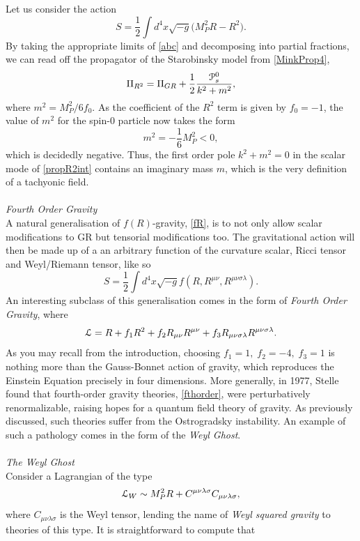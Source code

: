 Let us consider the action
\[
\label{R-R2}
S=\frac{1}{2}\int d^4 x \sqrt{-g} \bigl(M_P^2R-R^2\bigr)
.\]
By taking the appropriate limits of \eqref{abc} and decomposing into partial fractions, we can read off the propagator of the Starobinsky model from \eqref{MinkProp4},
\[
\label{propR2int}
\Pi_{R^2}=\Pi_{GR}+\frac{1}{2}\frac{{\cal P}_s^0}{k^2+m^2}
,\]  
where $m^2=M_P^2/6f_0$. As the coefficient of the $R^2$ term is given by $f_0=-1$, 
the value of $m^2$ for the spin-0 particle now takes the form 
\[
m^2=-\frac{1}{6}M_P^2<0
,\]
which is decidedly negative. Thus, the first order pole $k^2+m^2=0$ in the scalar mode of \eqref{propR2int} contains an imaginary mass $m$, which is the very definition of a tachyonic field.
\\\\ \emph{Fourth Order Gravity}\\
A natural generalisation of $f(R)$-gravity, \eqref{fR}, is to not only allow scalar modifications to GR but tensorial modifications too. The gravitational action will then be made up of a an arbitrary function of the curvature scalar, Ricci tensor and Weyl/Riemann tensor, like so
\[
\label{fRRuvRunop}
S=\frac{1}{2}\int d^4 x \sqrt{-g} f(R,R^{\mu\nu},R^{\mu\nu\sigma\lambda})
.\]
An interesting subclass of this generalisation comes in the form of \emph{Fourth Order Gravity}, where
\[
\label{fthorder}
{\cal L}=R+f_1 R^2 +f_2 R_{\mu\nu}R^{\mu\nu}+f_3 R_{\mu\nu\sigma\lambda}R^{\mu\nu\sigma\lambda}
.\]
As you may recall from the introduction, choosing $f_1=1,\;f_2=-4,\;f_3=1$ is nothing more than the Gauss-Bonnet action of gravity, which reproduces the Einstein Equation precisely in four dimensions. More generally, in 1977,  Stelle found that fourth-order gravity theories, \eqref{fthorder}, were perturbatively renormalizable, raising hopes for a quantum field theory of gravity. As previously discussed, such theories suffer from the Ostrogradsky instability. An example of such a pathology comes in the form of the \emph{Weyl Ghost}.  
\\\\ \emph{The Weyl Ghost}\\
Consider a Lagrangian of the type
\[
{\cal L}_{W}\sim M_P^2R+C^{\mu\nu\lambda\sigma}C_{\mu\nu\lambda\sigma}
,\]
where $C_{\mu\nu\lambda\sigma}$ is the Weyl tensor, lending the name of \emph{Weyl squared gravity} to theories of this type. It is straightforward to compute that
